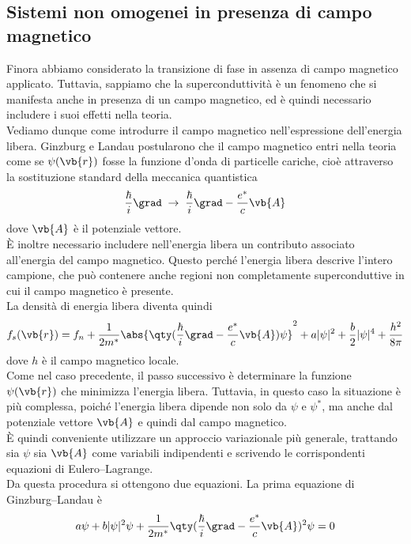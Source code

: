 \subsection{Sistemi non omogenei in presenza di campo magnetico}
Finora abbiamo considerato la transizione di fase in assenza di campo magnetico applicato. Tuttavia, sappiamo che la superconduttività è un fenomeno che si manifesta anche in presenza di un campo magnetico, ed è quindi necessario includere i suoi effetti nella teoria.\\
Vediamo dunque come introdurre il campo magnetico nell'espressione dell'energia libera. Ginzburg e Landau postularono che il campo magnetico entri nella teoria come se $\psi(\vb{r})$ fosse la funzione d'onda di particelle cariche, cioè attraverso la sostituzione standard della meccanica quantistica
\begin{equation*}
   \frac{\hbar}{i}\grad
   \;\to\;
   \frac{\hbar}{i}\grad - \frac{e^*}{c}\vb{A}
\end{equation*}
dove $\vb{A}$ è il potenziale vettore.\\
È inoltre necessario includere nell'energia libera un contributo associato all'energia del campo magnetico. Questo perché l'energia libera descrive l'intero campione, che può contenere anche regioni non completamente superconduttive in cui il campo magnetico è presente.\\
La densità di energia libera diventa quindi
\begin{equation*}
   f_s(\vb{r})
   = f_n
   + \frac{1}{2m^*}
   \abs{ \qty( \frac{\hbar}{i}\grad - \frac{e^*}{c}\vb{A} ) \psi }^2
   + a |\psi|^2
   + \frac{b}{2} |\psi|^4
   + \frac{h^2}{8\pi}
\end{equation*}
dove $h$ è il campo magnetico locale.\\
Come nel caso precedente, il passo successivo è determinare la funzione $\psi(\vb{r})$ che minimizza l'energia libera. Tuttavia, in questo caso la situazione è più complessa, poiché l'energia libera dipende non solo da $\psi$ e $\psi^*$, ma anche dal potenziale vettore $\vb{A}$ e quindi dal campo magnetico.\\
È quindi conveniente utilizzare un approccio variazionale più generale, trattando sia $\psi$ sia $\vb{A}$ come variabili indipendenti e scrivendo le corrispondenti equazioni di Eulero--Lagrange.\\
Da questa procedura si ottengono due equazioni. La prima equazione di Ginzburg--Landau è
\begin{equation}
   a\psi + b |\psi|^2 \psi
   + \frac{1}{2m^*}
   \qty(
   \frac{\hbar}{i}\grad - \frac{e^*}{c}\vb{A}
   )^2 \psi
   = 0
   \label{eq:1_GL_equation_with_magnetic_field}
\end{equation}
